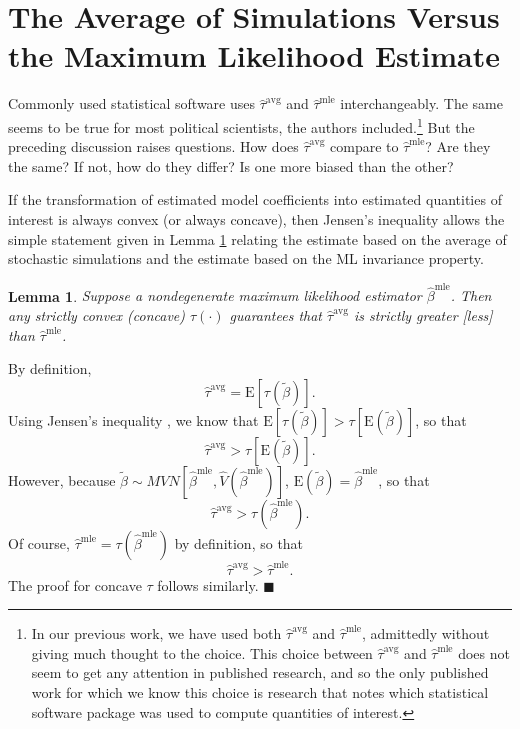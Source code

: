\documentclass[11pt]{article}
\newtheorem{lemma}{Lemma}
\newenvironment{proof}[1][Proof]{\begin{trivlist}
\item[\hskip \labelsep {\bfseries #1}]}{\end{trivlist}}
\begin{document}
\section*{The Average of Simulations Versus the Maximum Likelihood Estimate}

Commonly used statistical software uses $\hat{\tau}^\text{avg}$ and $\hat{\tau}^\text{mle}$ interchangeably. The same seems to be true for most political scientists, the authors included.\footnote{In our previous work, we have used both $\hat{\tau}^\text{avg}$ and $\hat{\tau}^\text{mle}$, admittedly without giving much thought to the choice. This choice between $\hat{\tau}^\text{avg}$ and $\hat{\tau}^\text{mle}$ does not seem to get any attention in published research, and so the only published work for which we know this choice is research that notes which statistical software package was used to compute quantities of interest.} But the preceding discussion raises questions. How does $\hat{\tau}^\text{avg}$ compare to $\hat{\tau}^{\text{mle}}$? Are they the same? If not, how do they differ? Is one more biased than the other?

If the transformation of estimated model coefficients into estimated quantities of interest is always convex (or always concave), then Jensen's inequality allows the simple statement given in Lemma \ref{lem:direction} relating the estimate based on the average of stochastic simulations and the estimate based on the ML invariance property.

\begin{lemma}\label{lem:direction}
Suppose a nondegenerate maximum likelihood estimator $\hat{\beta}^\text{mle}$. Then any strictly convex (concave) $\tau(\cdot)$ guarantees that $\hat{\tau}^{\text{avg}}$ is strictly greater [less] than $\hat{\tau}^\text{mle}$.
\end{lemma}
\begin{proof}
By definition, $$ \hat{\tau}^{\text{avg}} = \text{E}\left[ \tau \left(\tilde{\beta} \right) \right].$$
Using Jensen's inequality \citep[p. 190, Thm. 4.7.7]{CasellaBerger2002}, we know that $\text{E}\left[ \tau \left(\tilde{\beta} \right) \right] > \tau \left[ \text{E}\left( \tilde{\beta} \right) \right]$, so that $$\hat{\tau}^{\text{avg}} > \tau \left[ \text{E}\left( \tilde{\beta} \right) \right].$$
However, because $\tilde{\beta} \sim MVN \left[ \hat{\beta}^{\text{mle}}, \hat{V} \left( \hat{\beta}^{\text{mle}} \right) \right]$, $\text{E}\left( \tilde{\beta} \right) = \hat{\beta}^\text{mle}$, so that
$$\hat{\tau}^{\text{avg}} > \tau \left( \hat{\beta}^\text{mle}\right).$$
Of course, $\hat{\tau}^\text{mle} = \tau \left( {\hat{\beta}^\text{mle}} \right)$ by definition, so that $$\hat{\tau}^{\text{avg}} > \hat{\tau}^\text{mle}.$$
The proof for concave $\tau$ follows similarly.
 $\blacksquare$
\end{proof}
\end{document}
